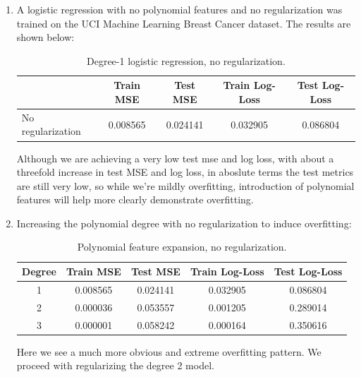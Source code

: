 \documentclass{article} %
\begin{document}
\begin{enumerate}
  \item A logistic regression with no polynomial features and no
    regularization was trained on the UCI Machine Learning Breast
    Cancer dataset.
    The results are shown below:
    \begin{table}[H]
      \centering
      \begin{tabular}{l c c c c}
        \hline
        & Train MSE & Test MSE & Train Log-Loss & Test Log-Loss \\
        \hline
        No regularization & 0.008565 & 0.024141 & 0.032905 & 0.086804 \\
        \hline
      \end{tabular}
      \caption{Degree-1 logistic regression, no regularization.}
    \end{table}
    Although we are achieving a very low test mse and log loss, with
    about a threefold increase in test MSE and log loss, in aboslute
    terms the test metrics are still very low, so while we're mildly
    overfitting, introduction of polynomial features will help more
    clearly demonstrate overfitting.

  \item Increasing the polynomial degree with no regularization to
    induce overfitting:
    \begin{table}[H]
      \centering
      \begin{tabular}{c c c c c}
        \hline
        Degree & Train MSE & Test MSE & Train Log-Loss & Test Log-Loss \\
        \hline
        1 & 0.008565 & 0.024141 & 0.032905 & 0.086804 \\
        2 & 0.000036 & 0.053557 & 0.001205 & 0.289014 \\
        3 & 0.000001 & 0.058242 & 0.000164 & 0.350616 \\
        \hline
      \end{tabular}
      \caption{Polynomial feature expansion, no regularization.}
    \end{table}
    Here we see a much more obvious and extreme overfitting pattern.
    We proceed with regularizing the degree 2 model.


\end{enumerate}
\end{document}
